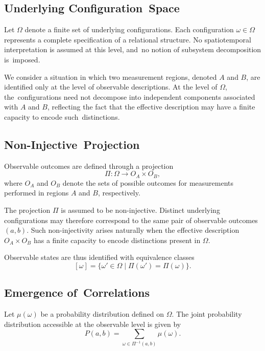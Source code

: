 \documentclass[11pt,a4paper]{article}
\theoremstyle{remark}
\begin{document}
\subsection{Underlying Configuration~Space}
    \label{subsec:underlying-configuration-space}

    Let $\Omega$ denote a finite set of underlying configurations.
    Each configuration $\omega \in \Omega$ represents a complete specification of a relational structure.
    No spatiotemporal interpretation is assumed at this level, and~no notion of
    subsystem decomposition is~imposed.

    We consider a situation in which two measurement regions, denoted $A$ and $B$, are
    identified only at the level of observable descriptions.
    At the level of $\Omega$, the~configurations need not decompose into independent
    components associated with $A$ and $B$, reflecting the fact that the effective
    description may have a finite capacity to encode such~distinctions.

 \subsection{Non-Injective~Projection}
    \label{subsec:non-injective-projection}

    Observable outcomes are defined through a projection
    \[
      \Pi : \Omega \rightarrow O_A \times O_B ,
    \]
    where $O_A$ and $O_B$ denote the sets of possible outcomes for measurements performed
    in regions $A$ and $B$, respectively.

    The projection $\Pi$ is assumed to be non-injective.
    Distinct underlying configurations may therefore correspond to the same pair of
    observable outcomes $(a,b)$.
    Such non-injectivity arises naturally when the effective description $O_A \times O_B$
    has a finite capacity to encode distinctions present in $\Omega$.

    Observable states are thus identified with equivalence classes
    \[
      [\omega] = \{ \omega' \in \Omega \mid \Pi(\omega') = \Pi(\omega) \}.
    \]

  \subsection{Emergence of~Correlations}
    \label{subsec:emergence-of-correlations}

    Let $\mu(\omega)$ be a probability distribution defined on $\Omega$.
    The joint probability distribution accessible at the observable level is given by
    \[
      P(a,b) = \sum_{\omega \in \Pi^{-1}(a,b)} \mu(\omega).
    \]
\end{document}
